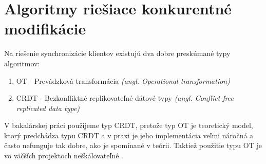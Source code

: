 \section{Algoritmy riešiace konkurentné modifikácie}
Na riešenie synchronizácie klientov existujú dva dobre preskúmané typy algoritmov:
\begin{enumerate}
  \item OT - Prevádzková transformácia \textit{(angl. Operational transformation)}
  \item CRDT - Bezkonfliktné replikovateľné dátové typy 
  \textit{(angl. Conflict-free replicated data type)}
\end{enumerate}

V bakalárskej práci použijeme typ CRDT, pretože typ OT je teoretický model, ktorý predchádza typu CRDT a v praxi
je jeho implementácia veľmi náročná a často nefunguje tak dobre, ako je spomínané v teórii.
Taktiež použitie typu OT je vo väčších projektoch neškálovateľné \cite{ot_nonscalable}. 
